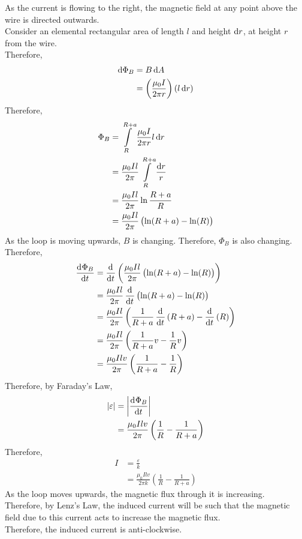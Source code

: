 \documentclass[fleqn, a4paper, 12pt, twoside]{article}
\theoremstyle{definition}
\theoremstyle{theorem}
\begin{document}
\begin{solution}
	As the current is flowing to the right, the magnetic field at any point above the wire is directed outwards.\\
	Consider an elemental rectangular area of length $l$ and height $\dif r$, at height $r$ from the wire.\\
	Therefore,
	\begin{align*}
		\dif \Phi_B & = B \dif A                                          \\
                            & = \left( \frac{\mu_0 I}{2 \pi r} \right) (l \dif r) \\
	\end{align*}
	Therefore,
	\begin{align*}
		\Phi_B & = \int\limits_{R}^{R + a} \frac{\mu_0 I}{2 \pi r} l \dif r         \\
                       & = \frac{\mu_0 I l}{2 \pi} \int\limits_{R}^{R + a} \frac{\dif r}{r} \\
                       & = \frac{\mu_0 I l}{2 \pi} \ln \frac{R + a}{R}                      \\
                       & = \frac{\mu_0 I l}{2 \pi} \left( \ln(R + a) - \ln(R) \right)
	\end{align*}
	As the loop is moving upwards, $B$ is changing.
	Therefore, $\Phi_B$ is also changing.\\
	Therefore,
	\begin{align*}
		\dod{\Phi_B}{t} & = \dod{}{t}\left( \frac{\mu_0 I l}{2 \pi} \left( \ln(R + a) - \ln(R) \right) \right)     \\
                                & = \frac{\mu_0 I l}{2 \pi} \dod{}{t} \left( \ln(R + a) - \ln(R) \right)                   \\
                                & = \frac{\mu_0 I l}{2 \pi} \left( \frac{1}{R + a} \dod{}{t}(R + a) - \dod{}{t}(R) \right) \\
                                & = \frac{\mu_0 I l}{2 \pi} \left( \frac{1}{R + a} v - \frac{1}{R} v \right)               \\
                                & = \frac{\mu_0 I l v}{2 \pi} \left( \frac{1}{R + a} - \frac{1}{R} \right)
	\end{align*}
	Therefore, by Faraday's Law,
	\begin{align*}
		|\varepsilon| & = \left| \dod{\Phi_B}{t} \right| \\
                              & = \frac{\mu_0 I l v}{2 \pi} \left( \frac{1}{R} - \frac{1}{R + a} \right)
	\end{align*}
	Therefore,
	\begin{align*}
		I & = \frac{\varepsilon}{k} \\
                  & = \frac{\mu_0 I l v}{2 \pi k} \left( \frac{1}{R} - \frac{1}{R + a} \right)
	\end{align*}
	As the loop moves upwards, the magnetic flux through it is increasing.\\
	Therefore, by Lenz's Law, the induced current will be such that the magnetic field due to this current acts to increase the magnetic flux.\\
	Therefore, the induced current is anti-clockwise.
\end{solution}
\end{document}

